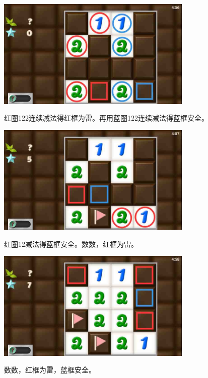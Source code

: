 \subsection{} %
\begin{center}
    \includegraphics[width=0.7\textwidth]{puzzlelow/56-1.jpg}
\end{center}
红圈122连续减法得红框为雷。再用蓝圈122连续减法得蓝框安全。
\begin{center}
    \includegraphics[width=0.7\textwidth]{puzzlelow/56-2.jpg}
\end{center}
红圈12减法得蓝框安全。数数，红框为雷。
\begin{center}
    \includegraphics[width=0.7\textwidth]{puzzlelow/56-3.jpg}
\end{center}
数数，红框为雷，蓝框安全。

